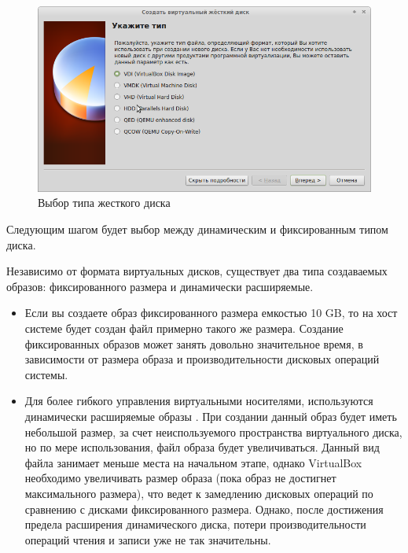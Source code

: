 \documentclass[12pt,a4paper]{article}
\begin{document}
\begin{figure}[h!]
\centering
\includegraphics[scale=0.45]{res/TypeOfHardDrive}
\caption{Выбор типа жесткого диска}
\end{figure}

Следующим шагом будет выбор между динамическим и фиксированным типом диска. 

Независимо от формата виртуальных дисков, существует два типа создаваемых образов: фиксированного размера и динамически расширяемые.
\begin{itemize}
\item Если вы создаете образ фиксированного размера емкостью 10 GB, то на хост системе будет создан файл примерно такого же размера. Создание фиксированных образов может занять довольно значительное время, в зависимости от размера образа и производительности дисковых операций системы.
\item Для более гибкого управления виртуальными носителями, используются динамически расширяемые образы . При создании данный образ будет иметь небольшой размер, за счет неиспользуемого пространства виртуального диска, но по мере использования, файл образа будет увеличиваться. Данный вид файла занимает меньше места на начальном этапе, однако VirtualBox необходимо увеличивать размер образа (пока образ не достигнет максимального размера), что ведет к замедлению дисковых операций по сравнению с дисками фиксированного размера. Однако, после достижения предела расширения динамического диска, потери производительности операций чтения и записи уже не так значительны.
\end{itemize}
\end{document}

